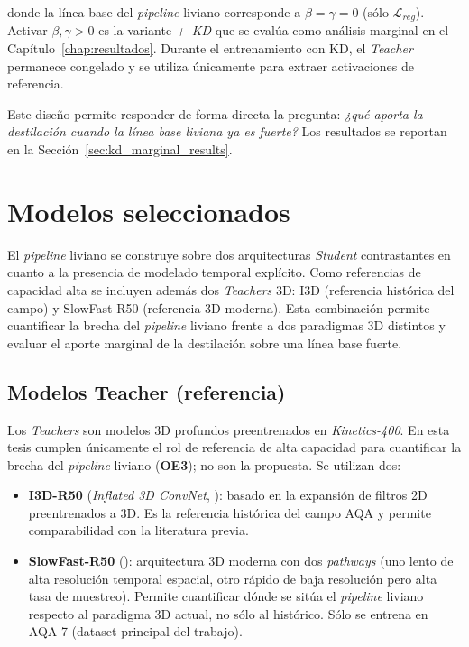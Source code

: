 donde la línea base del \textit{pipeline} liviano corresponde a $\beta = \gamma = 0$ (sólo $\mathcal{L}_{reg}$). Activar $\beta, \gamma > 0$ es la variante \textit{+~KD} que se evalúa como análisis marginal en el Capítulo~\ref{chap:resultados}. Durante el entrenamiento con \ac{KD}, el \textit{Teacher} permanece congelado y se utiliza únicamente para extraer activaciones de referencia.

Este diseño permite responder de forma directa la pregunta: \textit{¿qué aporta la destilación cuando la línea base liviana ya es fuerte?} Los resultados se reportan en la Sección~\ref{sec:kd_marginal_results}.


\section{Modelos seleccionados}
\label{sec:modelos}

El \textit{pipeline} liviano se construye sobre dos arquitecturas \textit{Student} contrastantes en cuanto a la presencia de modelado temporal explícito. Como referencias de capacidad alta se incluyen además dos \textit{Teachers} 3D: \ac{I3D} (referencia histórica del campo) y SlowFast-R50 (referencia 3D moderna). Esta combinación permite cuantificar la brecha del \textit{pipeline} liviano frente a dos paradigmas 3D distintos y evaluar el aporte marginal de la destilación sobre una línea base fuerte.

\subsection{Modelos Teacher (referencia)}

Los \textit{Teachers} son modelos 3D profundos preentrenados en \textit{Kinetics-400}. En esta tesis cumplen únicamente el rol de referencia de alta capacidad para cuantificar la brecha del \textit{pipeline} liviano (\textbf{OE3}); no son la propuesta. Se utilizan dos:

\begin{itemize}
    \item \textbf{I3D-R50} (\textit{Inflated 3D ConvNet}, \cite{Carreira2017I3D}): basado en la expansión de filtros 2D preentrenados a 3D. Es la referencia histórica del campo \ac{AQA} y permite comparabilidad con la literatura previa.
    \item \textbf{SlowFast-R50} (\cite{feichtenhofer2019slowfast}): arquitectura 3D moderna con dos \textit{pathways} (uno lento de alta resolución temporal espacial, otro rápido de baja resolución pero alta tasa de muestreo). Permite cuantificar dónde se sitúa el \textit{pipeline} liviano respecto al paradigma 3D actual, no sólo al histórico. Sólo se entrena en AQA-7 (dataset principal del trabajo).
\end{itemize}

